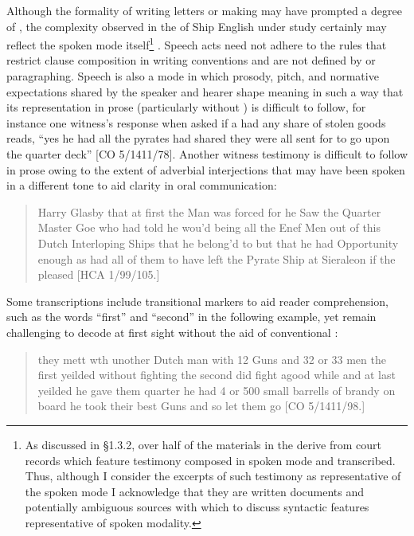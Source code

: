 Although the formality of writing letters or making  may have prompted a degree of , the complexity observed in the  of Ship English under study certainly may reflect the spoken mode itself\footnote{As discussed in §1.3.2, over half of the materials in the  derive from court records which feature testimony composed in spoken mode and transcribed. Thus, although I consider the excerpts of such testimony as representative of the spoken mode I acknowledge that they are written documents and potentially ambiguous sources with which to discuss syntactic features representative of spoken modality.} . Speech acts need not adhere to the rules that restrict clause composition in writing conventions and are not defined by  or paragraphing. Speech is also a mode in which prosody, pitch, and normative expectations shared by the speaker and hearer shape meaning in such a way that its representation in prose (particularly without ) is difficult to follow, for instance one witness’s response when asked if a  had any share of stolen goods reads, “yes he had all the pyrates had shared they were all sent for to go upon the quarter deck” [CO 5/1411/78]. Another witness testimony is difficult to follow in prose owing to the extent of adverbial interjections that may have been spoken in a different tone to aid clarity in oral communication:

\begin{quotation}
Harry Glasby that at first the Man was forced for he Saw the Quarter Master Goe who had told he wou’d being all the Enef Men out of this Dutch Interloping Ships that he belong’d to but that he had Opportunity enough as had all of them to have left the Pyrate Ship at Sieraleon if the pleased [HCA 1/99/105.]
\end{quotation}

Some transcriptions include transitional markers to aid reader comprehension, such as the words “first” and “second” in the following example, yet remain challenging to decode at first sight without the aid of conventional : 

\begin{quotation}
they mett wth unother Dutch man with 12 Guns and 32 or 33 men the first yeilded without fighting the second did fight agood while and at last yeilded he gave them quarter he had 4 or 500 small barrells of brandy on board he took their best Guns and so let them go [CO 5/1411/98.]
\end{quotation}

